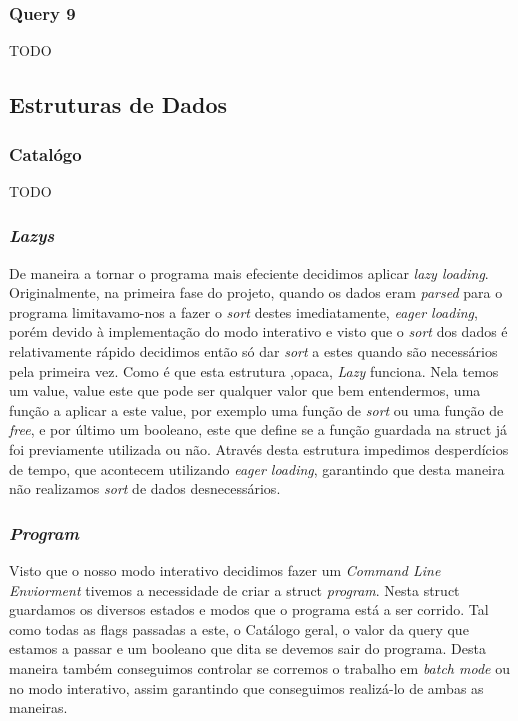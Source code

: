 \documentclass{article}
\begin{document}
        \subsubsection{Query 9}
            TODO
    \subsection{Estruturas de Dados}
        \subsubsection{Catalógo}
            TODO
        \subsubsection{\emph{Lazys}}
            De maneira a tornar o programa mais efeciente decidimos aplicar 
            \emph{lazy loading}. Originalmente, na primeira fase do projeto,
            quando os dados eram \emph{parsed} para o programa limitavamo-nos a 
            fazer o \emph{sort} destes imediatamente, \emph{eager loading}, porém devido
            à implementação do modo interativo e visto que o \emph{sort} dos dados é relativamente rápido
            decidimos então só dar \emph{sort} a estes quando são necessários pela primeira vez.
            Como é que esta estrutura ,opaca, \emph{Lazy} funciona. Nela temos um
            value, value este que pode ser qualquer valor que bem entendermos, uma função a aplicar a este
            value, por exemplo uma função de \emph{sort} ou uma função de \emph{free}, e por último
            um booleano, este que define se a função guardada na struct já foi previamente utilizada ou
            não. Através desta estrutura impedimos desperdícios de tempo, que acontecem utilizando \emph{eager
            loading}, garantindo que desta maneira não realizamos \emph{sort} de dados desnecessários.
        \subsubsection{\emph{Program}}
            Visto que o nosso modo interativo decidimos fazer um \emph{Command Line Enviorment} tivemos a necessidade de criar a struct \emph{program}. Nesta struct guardamos os diversos estados e modos
            que o programa está a ser corrido. Tal como todas as flags passadas a este, o Catálogo geral, o valor
            da query que estamos a passar e um booleano que dita se devemos sair do programa. Desta maneira também conseguimos controlar se corremos o trabalho em \emph{batch mode} ou no modo interativo, assim garantindo que conseguimos realizá-lo de ambas as maneiras.
\end{document}
